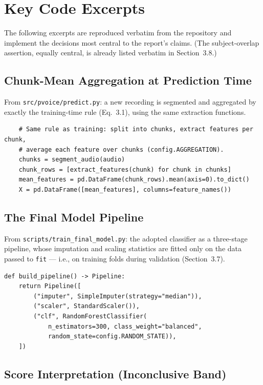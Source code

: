 \chapter{Key Code Excerpts}
\label{app:code}

The following excerpts are reproduced verbatim from the repository and
implement the decisions most central to the report's claims. (The
subject-overlap assertion, equally central, is already listed verbatim
in Section~3.8.)

\section{Chunk-Mean Aggregation at Prediction Time}

From \texttt{src/pvoice/predict.py}: a new recording is segmented and
aggregated by exactly the training-time rule (Eq.~3.1), using the same
extraction functions.

{\small
\begin{verbatim}
    # Same rule as training: split into chunks, extract features per chunk,
    # average each feature over chunks (config.AGGREGATION).
    chunks = segment_audio(audio)
    chunk_rows = [extract_features(chunk) for chunk in chunks]
    mean_features = pd.DataFrame(chunk_rows).mean(axis=0).to_dict()
    X = pd.DataFrame([mean_features], columns=feature_names())
\end{verbatim}
}

\section{The Final Model Pipeline}

From \texttt{scripts/train\_final\_model.py}: the adopted classifier
as a three-stage pipeline, whose imputation and scaling statistics are
fitted only on the data passed to \texttt{fit} --- i.e., on training
folds during validation (Section~3.7).

{\small
\begin{verbatim}
def build_pipeline() -> Pipeline:
    return Pipeline([
        ("imputer", SimpleImputer(strategy="median")),
        ("scaler", StandardScaler()),
        ("clf", RandomForestClassifier(
            n_estimators=300, class_weight="balanced",
            random_state=config.RANDOM_STATE)),
    ])
\end{verbatim}
}

\section{Score Interpretation (Inconclusive Band)}


